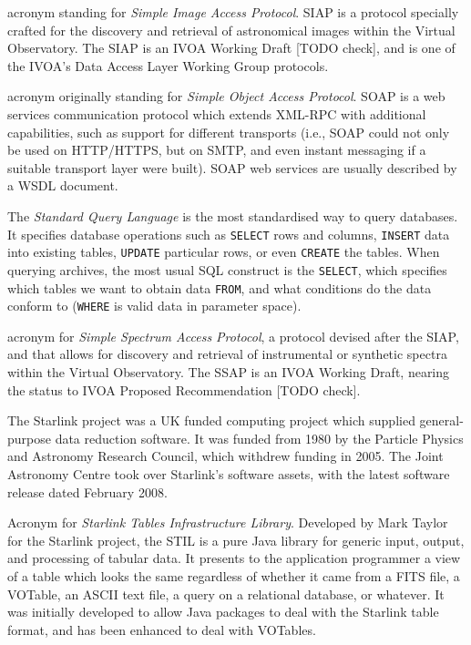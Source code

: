 {
    	acronym standing for \emph{Simple Image Access Protocol}. SIAP
        is a protocol specially crafted for the discovery and retrieval
        of astronomical images within the \gls{Virtual Observatory}.
        The SIAP is an \gls{IVOA} \gls{Working Draft} [TODO check], and
        is one of the IVOA's \gls{Data Access Layer} \gls{Working
        Group} protocols.
}

{
    	acronym originally standing for \emph{Simple Object Access
        Protocol}. SOAP is a web services communication protocol which
        extends \gls{XML-RPC} with additional capabilities, such as
        support for different transports (i.e., SOAP could not only be
        used on \gls{HTTP}/HTTPS, but on \gls{SMTP}, and even instant
        messaging if a suitable transport layer were built). SOAP web
        services are usually described by a \gls{WSDL} document.
}

{
    	The \emph{Standard Query Language} is the most standardised way
        to query databases. It specifies database operations such as
        \texttt{SELECT} rows and columns, \texttt{INSERT} data into
        existing tables, \texttt{UPDATE} particular rows, or even
        \texttt{CREATE} the tables. When querying archives, the most
        usual SQL construct is the \texttt{SELECT}, which specifies
        which tables we want to obtain data \texttt{FROM}, and what
        conditions do the data conform to (\texttt{WHERE} is valid data
        in parameter space).
}

{
    	acronym for \emph{Simple Spectrum Access Protocol}, a protocol
        devised after the \gls{SIAP}, and that allows for discovery and
        retrieval of instrumental or synthetic spectra within the
        \gls{Virtual Observatory}. The SSAP is an \gls{IVOA Working
        Draft}, nearing the status to \gls{IVOA Proposed
        Recommendation} [TODO check].
}

{
    	 The Starlink project was a UK funded computing project which
         supplied general-purpose data reduction software. It was
         funded from 1980 by the Particle Physics and Astronomy
         Research Council, which withdrew funding in 2005. The Joint
         Astronomy Centre took over Starlink's software assets, with
         the latest software release dated February 2008.
}

{
		Acronym for \emph{Starlink Tables Infrastructure Library}.
		Developed by Mark Taylor for the \gls{Starlink project},
		the STIL is a pure \gls{Java} library for generic input,
		output, and processing of tabular data. It presents to the
		application programmer a view of a table which looks the
		same regardless of whether it came from a \gls{FITS} file,
		a \gls{VOTable}, an \gls{ASCII} text file, a query on a
		relational database, or whatever. It was initially
		developed to allow Java packages to deal with the Starlink
		table format, and has been enhanced to deal with VOTables.
}

